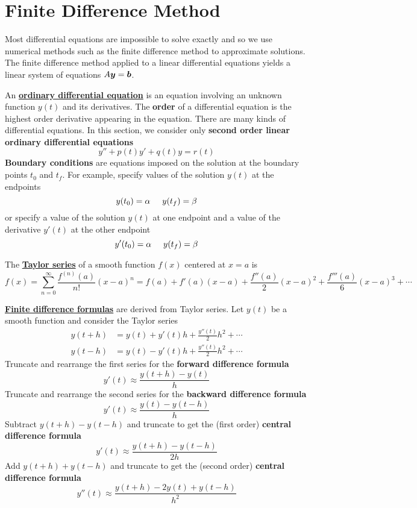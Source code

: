 \section{Finite Difference Method}

\begin{bigidea}
Most differential equations are impossible to solve exactly and so we use numerical methods such as the finite difference method to approximate solutions. The finite difference method applied to a linear differential equations yields a linear system of equations $A \boldsymbol{y} = \boldsymbol{b}$.
\end{bigidea}

\begin{definition}
An \href{https://en.wikipedia.org/wiki/Differential_equation}{\bf ordinary differential equation} is an equation involving an unknown function $y(t)$ and its derivatives. The {\bf order} of a differential equation is the highest order derivative appearing in the equation. There are many kinds of differential equations. In this section, we consider only {\bf second order linear ordinary differential equations}
$$
y'' + p(t)y' + q(t)y = r(t)
$$
{\bf Boundary conditions} are equations imposed on the solution at the boundary points $t_0$ and $t_f$. For example, specify values of the solution $y(t)$ at the endpoints
$$
y(t_0) = \alpha \hspace{5mm} y(t_f) = \beta
$$
or specify a value of the solution $y(t)$ at one endpoint and a value of the derivative $y'(t)$ at the other endpoint
$$
y'(t_0) = \alpha \hspace{5mm} y(t_f) = \beta
$$
\end{definition}

\begin{definition}
The \href{https://en.wikipedia.org/wiki/Taylor_series}{\bf Taylor series} of a smooth function $f(x)$ centered at $x=a$ is
$$
f(x) = \sum_{n=0}^{\infty} \frac{f^{(n)}(a)}{n!} (x-a)^n = f(a) + f'(a)(x-a) + \frac{f''(a)}{2}(x-a)^2 + \frac{f'''(a)}{6}(x-a)^3 + \cdots
$$
\end{definition}

\begin{definition}
\href{https://en.wikipedia.org/wiki/Finite_difference}{\bf Finite difference formulas} are derived from Taylor series. Let $y(t)$ be a smooth function and consider the Taylor series
\begin{align*}
y(t+h) &= y(t) + y'(t)h + \frac{y''(t)}{2}h^2 + \cdots \\
y(t-h) &= y(t) - y'(t)h + \frac{y''(t)}{2}h^2 + \cdots
\end{align*}
Truncate and rearrange the first series for the {\bf forward difference formula}
$$
y'(t) \approx \frac{y(t+h) - y(t)}{h}
$$
Truncate and rearrange the second series for the {\bf backward difference formula}
$$
y'(t) \approx \frac{y(t) - y(t - h)}{h}
$$
Subtract $y(t+h) - y(t-h)$ and truncate to get the (first order) {\bf central difference formula}
$$
y'(t) \approx \frac{y(t+h) - y(t-h)}{2h}
$$
Add $y(t+h) + y(t-h)$ and truncate to get the (second order) {\bf central difference formula}
$$
y''(t) \approx \frac{y(t+h) -2y(t) + y(t-h)}{h^2}
$$
\end{definition}

